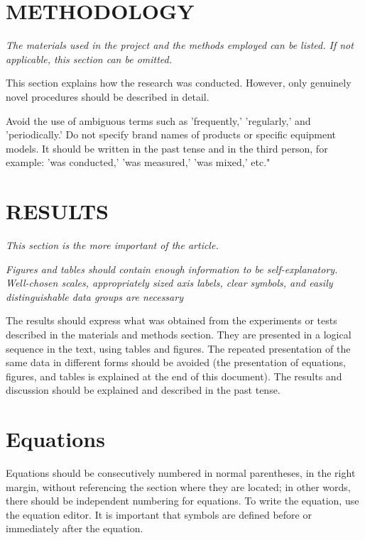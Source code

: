 \documentclass[a4paper,twocolumn,10.5pt]{article}
\begin{document}
\section{METHODOLOGY}

\emph{The materials used in the project and the methods employed can be listed. If not applicable, this section can be omitted.}

This section explains how the research was conducted. However, only genuinely novel procedures should be described in detail.

Avoid the use of ambiguous terms such as 'frequently,' 'regularly,' and 'periodically.' Do not specify brand names of products or specific equipment models. It should be written in the past tense and in the third person, for example: 'was conducted,' 'was measured,' 'was mixed,' etc."

\section{RESULTS}

\emph{This section is the more important of the article.}

\emph{Figures and tables should contain enough information to be self-explanatory. Well-chosen scales, appropriately sized axis labels, clear symbols, and easily distinguishable data groups are necessary
}

The results should express what was obtained from the experiments or tests described in the materials and methods section. They are presented in a logical sequence in the text, using tables and figures. The repeated presentation of the same data in different forms should be avoided (the presentation of equations, figures, and tables is explained at the end of this document). The results and discussion should be explained and described in the past tense.





\section*{Equations}

Equations should be consecutively numbered in normal parentheses, in the right margin, without referencing the section where they are located; in other words, there should be independent numbering for equations. To write the equation, use the equation editor. It is important that symbols are defined before or immediately after the equation.
\end{document}
